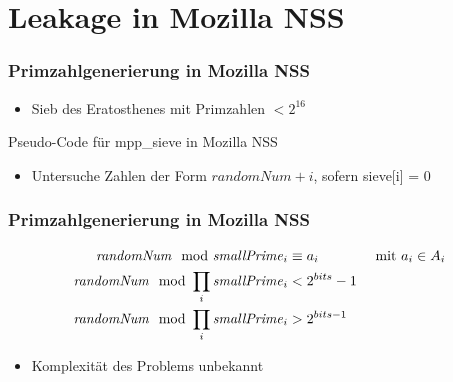 \section{Leakage in Mozilla NSS}

\begin{frame}
\frametitle{Primzahlgenerierung in Mozilla NSS}
\begin{itemize}
\item Sieb des Eratosthenes mit Primzahlen $<2^{16}$
\end{itemize}


\begin{algorithm}[H]
\DontPrintSemicolon
\caption{Pseudo-Code für mpp_sieve in Mozilla NSS}
\label{alg:sievePrimeGenerationNSS}
\end{algorithm}
\small
\begin{itemize}
\item Untersuche Zahlen der Form $randomNum + i$, sofern sieve[i] = 0
\end{itemize}

\end{frame}



\begin{frame}
\frametitle{Primzahlgenerierung in Mozilla NSS}
\begin{align*}
    \text{\textit{randomNum}} \mod \text{\textit{smallPrime}}_i &\equiv a_i &\text{ mit } a_i \in A_i\\
    \text{\textit{randomNum}} \mod \prod_i \text{\textit{smallPrime}}_i & < 2^{bits}-1 \\
    \text{\textit{randomNum}} \mod \prod_i \text{\textit{smallPrime}}_i & > 2^{bits-1}
\end{align*}
\begin{itemize}
\item Komplexität des Problems unbekannt
\end{itemize}

\end{frame}